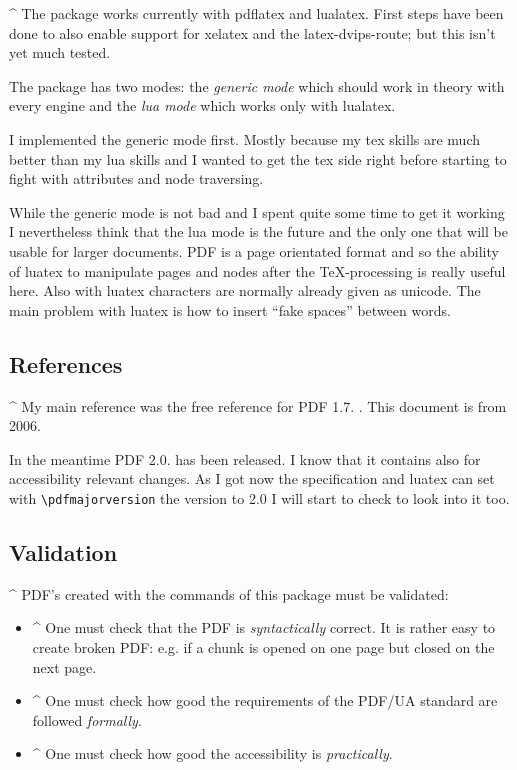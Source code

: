 \documentclass[DIV=12,parskip=half-,bibliography=totoc]{scrartcl}
\newcommand\PDF{PDF}
\begin{document}
\TagP^ The package works currently with pdflatex and lualatex. First steps have been done to also enable support for xelatex and the latex-dvips-route; but this isn't yet much tested.

\TagP The package has two modes: the \emph{generic mode} which should work in theory with every engine and the \emph{lua mode} which works only with lualatex.


\TagP I implemented the generic mode first. Mostly because my tex skills are much better than my lua skills and I wanted to get the tex side right before starting to fight with attributes and node traversing.

\TagP While the generic mode is not bad and I spent quite some time to get it working I nevertheless think that the lua mode is the future and the only one that will be usable for larger documents. \PDF{} is a page orientated format and so the ability of luatex to manipulate pages and nodes after the \TeX-processing is really useful here. Also with luatex characters are normally already given as unicode. The main problem with luatex is how to insert \enquote{fake spaces} between words.%
\TagPend



\subsection{References}

\TagP^ My main reference was the free reference for \PDF{} 1.7. \parencite{pdfreference}. This document is from 2006.

\TagP In the meantime \PDF{} 2.0. has been released. I know that it contains also for accessibility relevant changes. As I got now the specification and luatex can set with \verb+\pdfmajorversion+ the version to 2.0 I will start to check to look into it too.%
\TagPend

\subsection{Validation}

\TagP^ \PDF{}'s created with the commands of this package must be validated:\TagPend


\begin{itemize}
\item
\TagP^ One must check that the \PDF{} is \emph{syntactically} correct. It is rather easy to create broken \PDF{}: e.g. if a chunk is opened on one page but closed on the next page.
    \Pmeti
\item
\TagP^ One must check how good the requirements of the PDF/UA standard are followed \emph{formally}.
    \Pmeti
\item
\TagP^ One must check how good the accessibility is \emph{practically}.\Pmeti
\end{itemize}
\end{document}
